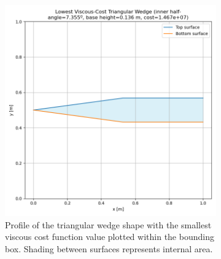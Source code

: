 \documentclass[11pt]{article}
\begin{document}
\begin{figure}[H]
\begin{subfigure}[b]{0.44\textwidth}
    \includegraphics[width=\linewidth]{../results/viscous/lowest_cost_wedge.png}
    \caption{Profile of the triangular wedge shape with the smallest viscous cost function value plotted within the bounding box. Shading between surfaces represents internal area.}
    \label{fig:vis-wedge-b}
\end{subfigure}
\caption{}
\label{fig:vis-wedge}
\end{figure}
\end{document}
